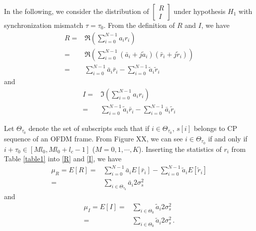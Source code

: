 In the following, we consider the distribution of $\begin{bmatrix}
	R \\
	I
   \end{bmatrix}$ under hypothesis $H_1$ with synchronization mismatch $\tau = \tau_0$.
From the definition of $R$ and $I$, we have 
\begin{equation}
  \begin{split}
  R = &\Re{(\sum_{i=0}^{N-1} a_ir_i)}\\
  = &\Re(\sum_{i=0}^{N-1}(\bar{a}_i+j\tilde{a}_i)(\bar{r}_i+j\tilde{r}_i))\\
  = &\sum_{i=0}^{N-1}\bar{a}_i\bar{r}_i - \sum_{i=0}^{N-1}\tilde{a}_i\tilde{r}_i
\end{split}
  \label{R}
\end{equation}
and
\begin{equation}
  \begin{split}
    I = &\Im(\sum_{i=0}^{N-1} a_ir_i)\\
      = &\sum_{i=0}^{N-1}\tilde{a}_i\bar{r}_i - \sum_{i=0}^{N-1}\bar{a}_i\tilde{r}_i
  \end{split}
  \label{I}
\end{equation}

Let $\Theta_{\tau_0}$ denote the set of subscripts such that if $i \in \Theta_{\tau_0}$,  $s[i]$ belongs to  CP sequence of an OFDM frame.
From Figure XX, we can see $i \in \Theta_{\tau_0}$ if and only if $i + \tau_0 \in [Ml_0, Ml_0+l_c -1]$ ($M = 0, 1, \cdots, K$). Inserting the statistics of $r_i$ from Table \ref{table1} into \eqref{R} and \eqref{I}, we have
\begin{equation}
\begin{split}
 \mu_R =  E[R] = &\sum_{i=0}^{N-1}\bar{a}_iE[\bar{r}_i] - \sum_{i=0}^{N-1}\tilde{a}_iE[\tilde{r}_i]\\
 = &\sum_{i\in\Theta_{\tau_0}}\bar{a}_i2\sigma_s^2
  \end{split}
  \label{ER}
\end{equation}
and
\begin{equation}
\begin{split}
 \mu_I =  E[I] = &\sum_{i\in\Theta_0}\tilde{a}_i2\sigma_s^2\\
  = &\sum_{i\in\Theta_0}\tilde{a}_i2\sigma_s^2\,.
  \end{split}
  \label{EI}
\end{equation}

